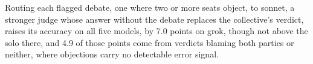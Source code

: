 Routing each flagged debate, one where two or more seats object, to sonnet,
a stronger judge whose answer without the debate replaces the
collective's verdict, raises its accuracy on all five models,
by 7.0 points on grok, though not above the
solo there, and 4.9 of those points come from verdicts blaming both parties or
neither, where objections carry no detectable error signal.
